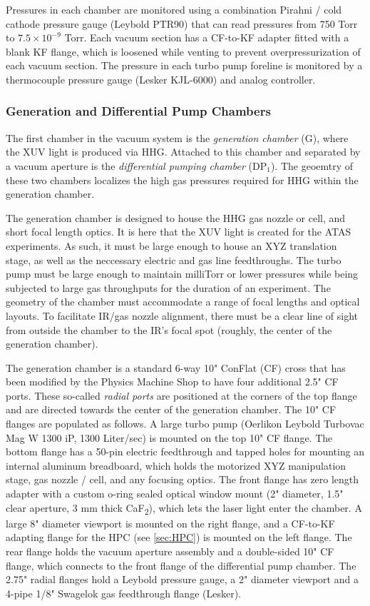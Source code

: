 Pressures in each chamber are monitored using a combination Pirahni / cold cathode pressure gauge (Leybold PTR90) that can read pressures from 750 Torr to $7.5 \times 10^{-9}$ Torr. Each vacuum section has a CF-to-KF adapter fitted with a blank KF flange, which is loosened while venting to prevent overpressurization of each vacuum section. The pressure in each turbo pump foreline is monitored by a thermocouple pressure gauge (Lesker KJL-6000) and analog controller.

\subsubsection{Generation and Differential Pump Chambers}

The first chamber in the vacuum system is the \textit{generation chamber} (G), where the XUV light is produced via HHG. Attached to this chamber and separated by a vacuum aperture is the \textit{differential pumping chamber} (DP$_1$). The geoemtry of these two chambers localizes the high gas pressures required for HHG within the generation chamber.

The generation chamber is designed to house the HHG gas nozzle or cell, and short focal length optics. It is here that the XUV light is created for the ATAS experiments. As such, it must be large enough to house an XYZ translation stage, as well as the neccessary electric and gas line feedthroughs. The turbo pump must be large enough to maintain milliTorr or lower pressures while being subjected to large gas throughputs for the duration of an experiment. The geometry of the chamber must accommodate a range of focal lengths and optical layouts. To facilitate IR/gas nozzle alignment, there must be a clear line of sight from outside the chamber to the IR's focal spot (roughly, the center of the generation chamber).

The generation chamber is a standard 6-way 10" ConFlat (CF) cross that has been modified by the Physics Machine Shop to have four additional 2.5" CF ports. These so-called \textit{radial ports} are positioned at the corners of the top flange and are directed towards the center of the generation chamber. The 10" CF flanges are populated as follows. A large turbo pump (Oerlikon Leybold Turbovac Mag W 1300 iP, 1300 Liter/sec) is mounted on the top 10" CF flange. The bottom flange has a 50-pin electric feedthrough and tapped holes for mounting an internal aluminum breadboard, which holds the motorized XYZ manipulation stage, gas nozzle / cell, and any focusing optics. The front flange has zero length adapter with a custom o-ring sealed optical window mount (2" diameter, 1.5" clear aperture, 3 mm thick CaF\textsubscript{2}), which lets the laser light enter the chamber. A large 8" diameter viewport is mounted on the right flange, and a CF-to-KF adapting flange for the HPC (see \cref{sec:HPC}) is mounted on the left flange. The rear flange holds the vacuum aperture assembly and a double-sided 10" CF flange, which connects to the front flange of the differential pump chamber. The 2.75" radial flanges hold a Leybold pressure gauge, a 2" diameter viewport and a 4-pipe 1/8" Swagelok gas feedthrough flange (Lesker).

